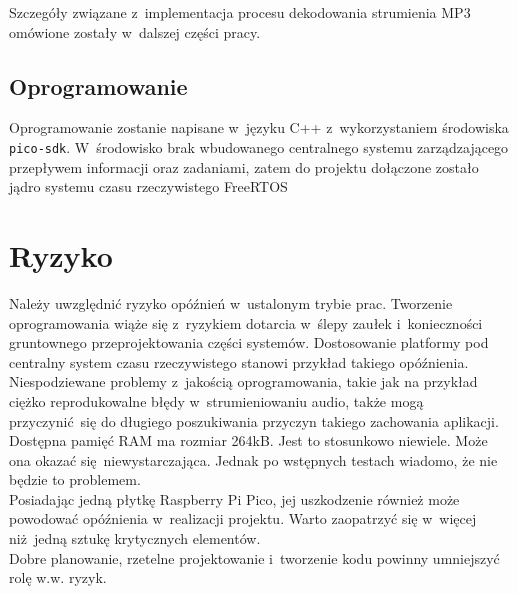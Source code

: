 \documentclass[polish]{aghengthesis}
\begin{document}
			Szczegóły związane z~implementacja procesu dekodowania strumienia MP3 omówione zostały w~dalszej części pracy.
		
		\subsection{Oprogramowanie}
			Oprogramowanie zostanie napisane w~języku C++ z~wykorzystaniem środowiska \lstinline|pico-sdk|\textsuperscript{\cite{pico_sdk}}.  W~środowisko brak wbudowanego centralnego systemu zarządzającego przepływem informacji oraz zadaniami, zatem do projektu dołączone zostało jądro systemu czasu rzeczywistego FreeRTOS\textsuperscript{\cite{freertos_kernel}}
	
	\section{Ryzyko}
		Należy uwzględnić ryzyko opóźnień w~ustalonym trybie prac. Tworzenie oprogramowania wiąże się z~ryzykiem dotarcia w~ślepy zaułek i~konieczności gruntownego przeprojektowania części systemów. Dostosowanie platformy pod centralny system czasu rzeczywistego stanowi przykład takiego opóźnienia.
		$ $\\
		
		Niespodziewane problemy z~jakością oprogramowania, takie jak na przykład ciężko reprodukowalne błędy w~strumieniowaniu audio, także mogą przyczynić się do długiego poszukiwania przyczyn takiego zachowania aplikacji.
		$ $\\
		
		Dostępna pamięć RAM ma rozmiar 264kB. Jest to stosunkowo niewiele. Może ona okazać się niewystarczająca. Jednak po wstępnych testach wiadomo, że nie będzie to problemem.
		$ $\\
		
		Posiadając jedną płytkę Raspberry Pi Pico, jej uszkodzenie również może powodować opóźnienia w~realizacji projektu. Warto zaopatrzyć się w~więcej niż jedną sztukę krytycznych elementów.
		$ $\\
		
		Dobre planowanie, rzetelne projektowanie i~tworzenie kodu powinny umniejszyć rolę w.w. ryzyk.
	
\end{document}
